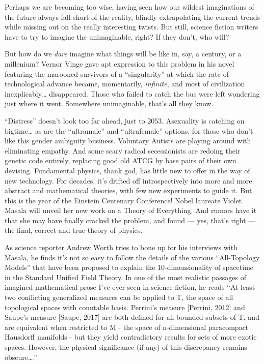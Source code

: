 \documentclass{article}
\begin{document}
Perhaps we are becoming too wise, having seen how our wildest
imaginations of the future always fall short of the reality, blindly
extrapolating the current trends while missing out on the really
interesting twists. But still, science fiction writers have to try to
imagine the unimaginable, right? If they don't, who will?

But how do we \emph{dare} imagine what things will be like in, say, a
century, or a millenium? Vernor Vinge gave apt expression to this
problem in his novel featuring the marooned survivors of a
``singularity'' at which the rate of technological advance became,
momentarily, \emph{infinite}, and most of civilization
inexplicably\ldots{} disappeared. Those who failed to catch the bus were
left wondering just where it went. Somewhere unimaginable, that's all
they know.

``Distress'' doesn't look too far ahead, just to 2053. Asexuality is
catching on bigtime\ldots{} as are the ``ultramale'' and ``ultrafemale''
options, for those who don't like this gender ambiguity business.
Voluntary Autists are playing around with eliminating empathy. And some
scary radical secessionists are redoing their genetic code entirely,
replacing good old ATCG by base pairs of their own devising. Fundamental
physics, thank god, has little new to offer in the way of new
technology. For decades, it's drifted off introspectively into more and
more abstract and mathematical theories, with few new experiments to
guide it. But this is the year of the Einstein Centenary Conference!
Nobel laureate Violet Masala will unveil her new work on a Theory of
Everything. And rumors have it that she may have finally cracked the
problem, and found --- yes, that's right --- the final, correct and true
theory of physics.

As science reporter Andrew Worth tries to bone up for his interviews
with Masala, he finds it's not so easy to follow the details of the
various ``All-Topology Models'' that have been proposed to explain the
10-dimensionality of spacetime in the Standard Unified Field Theory. In
one of the most realistic passages of imagined mathematical prose I've
ever seen in science fiction, he reads ``At least two conflicting
generalized measures can be applied to T, the space of all topological
spaces with countable basis. Perrini's measure {[}Perrini, 2012{]} and
Saupe's measure {[}Saupe, 2017{]} are both defined for all bounded
subsets of T, and are equivalent when restricted to M - the space of
n-dimensional paracompact Hausdorff manifolds - but they yield
contradictory results for sets of more exotic spaces. However, the
physical significance (if any) of this discrepancy remains
obscure\ldots.''
\end{document}
